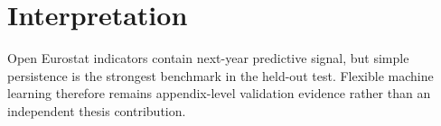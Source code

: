 \begin{table}[H]
\centering
\small
\caption{Blocked country-holdout predictive performance. Folds hold out countries rather than years to test transfer beyond persistent country structure; no population weights are applied.}
\label{tab:ml_country_holdout_summary}

\end{table}

\section{Interpretation}

Open Eurostat indicators contain next-year predictive signal, but simple persistence is the strongest benchmark in the held-out test. Flexible machine learning therefore remains appendix-level validation evidence rather than an independent thesis contribution.
